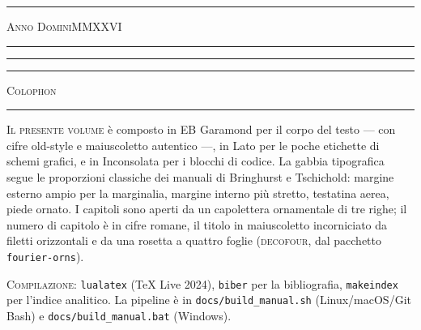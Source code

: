 \begin{titlepage}
\vspace{0.6cm}

\rule{0.55\textwidth}{0.4pt}\par
\vspace{0.4em}
{\rmfamily\Large\scshape Anno Domini\quad MMXXVI}\par
\vspace{0.4em}
\rule{0.55\textwidth}{0.4pt}

\vspace{0.6cm}

\rule{0.78\textwidth}{0.4pt}\par
\vspace{2pt}
\rule{0.78\textwidth}{1.2pt}

\end{titlepage}

\thispagestyle{empty}
\null\vfill
\begin{center}
{\Large\color{cIndaco}\decofourleft\enskip\decofourright}\par
\vspace{0.4em}
{\rmfamily\scshape\large Colophon}\par
\vspace{0.2em}
\rule{0.3\textwidth}{0.4pt}
\end{center}
\vspace{0.6em}

\noindent\small\rmfamily
\textsc{Il presente volume} \`e composto in EB Garamond per il corpo
del testo --- con cifre old-style e maiuscoletto autentico ---,
in Lato per le poche etichette di schemi grafici, e in Inconsolata
per i blocchi di codice. La gabbia tipografica segue le proporzioni
classiche dei manuali di Bringhurst e Tschichold: margine esterno
ampio per la marginalia, margine interno pi\`u stretto, testatina
aerea, piede ornato. I capitoli sono aperti da un capolettera
ornamentale di tre righe; il numero di capitolo \`e in cifre romane,
il titolo in maiuscoletto incorniciato da filetti orizzontali e
da una rosetta a quattro foglie (\textsc{decofour}, dal pacchetto
\texttt{fourier-orns}).

\bigskip
\noindent\textsc{Compilazione}: \texttt{lualatex} (\TeX{} Live 2024),
\texttt{biber} per la bibliografia, \texttt{makeindex} per l'indice
analitico. La pipeline \`e in \texttt{docs/build\_manual.sh}
(Linux/macOS/Git Bash) e \texttt{docs/build\_manual.bat} (Windows).

